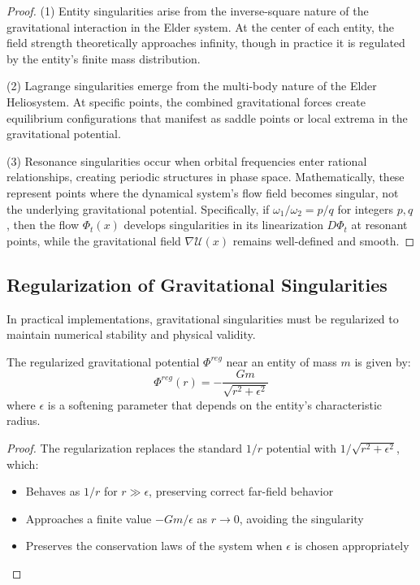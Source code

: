 \begin{definition}
\begin{enumerate}
\begin{proof}
(1) Entity singularities arise from the inverse-square nature of the gravitational interaction in the Elder system. At the center of each entity, the field strength theoretically approaches infinity, though in practice it is regulated by the entity's finite mass distribution.

(2) Lagrange singularities emerge from the multi-body nature of the Elder Heliosystem. At specific points, the combined gravitational forces create equilibrium configurations that manifest as saddle points or local extrema in the gravitational potential.

(3) Resonance singularities occur when orbital frequencies enter rational relationships, creating periodic structures in phase space. Mathematically, these represent points where the dynamical system's flow field becomes singular, not the underlying gravitational potential. Specifically, if $\omega_1/\omega_2 = p/q$ for integers $p,q$, then the flow $\Phi_t(x)$ develops singularities in its linearization $D\Phi_t$ at resonant points, while the gravitational field $\nabla \mathcal{U}(x)$ remains well-defined and smooth.
\end{proof}

\subsection{Regularization of Gravitational Singularities}

In practical implementations, gravitational singularities must be regularized to maintain numerical stability and physical validity.

\begin{theorem}
The regularized gravitational potential $\Phi^{reg}$ near an entity of mass $m$ is given by:
\begin{equation}
\Phi^{reg}(r) = -\frac{Gm}{\sqrt{r^2 + \epsilon^2}}
\end{equation}
where $\epsilon$ is a softening parameter that depends on the entity's characteristic radius.
\end{theorem}

\begin{proof}
The regularization replaces the standard $1/r$ potential with $1/\sqrt{r^2 + \epsilon^2}$, which:
\begin{itemize}
    \item Behaves as $1/r$ for $r \gg \epsilon$, preserving correct far-field behavior
    \item Approaches a finite value $-Gm/\epsilon$ as $r \to 0$, avoiding the singularity
    \item Preserves the conservation laws of the system when $\epsilon$ is chosen appropriately
\end{itemize}


\end{proof}
\end{enumerate}
\end{definition}
